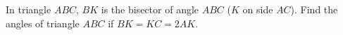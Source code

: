 In triangle $ABC$, $BK$ is the bisector of angle $ABC$ ($K$ on side $AC$). Find the angles of triangle $ABC$ if $BK=KC=2AK$.
